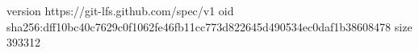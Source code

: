 version https://git-lfs.github.com/spec/v1
oid sha256:dff10bc40c7629c0f1062fe46fb11cc773d822645d490534ec0daf1b38608478
size 393312
